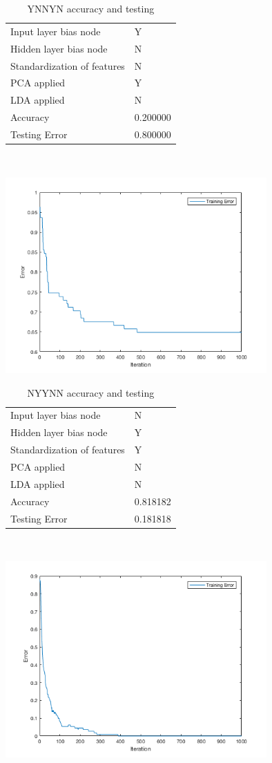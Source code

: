 \documentclass[12pt]{article}
\newcommand{\accuracyAndTestErrorTable}[8]{
  \begin{tabular}{l|l}
    \hline
    Input layer bias node & #1 \\
    Hidden layer bias node & #2 \\
    Standardization of features & #3 \\
    PCA applied & #4 \\
    LDA applied & #5 \\
    \hline
    Accuracy & #6 \\
    Testing Error & #7 \\
    \hline
  \end{tabular}
  ~\\[60pt]
  \caption{#8}
}
\begin{document}
\begin{center}
  \begin{table}[H]
    \begin{varwidth}[b]{0.4\linewidth}
      \centering
      \accuracyAndTestErrorTable{Y}{N}{N}{Y}{N}{0.200000}{0.800000}{YNNYN accuracy and testing}
      \label{table:YNNYN}
    \end{varwidth}%
    \hfill
    \begin{minipage}[b]{0.6\linewidth}
      \centering
      \includegraphics[width=100mm]{YNNYN_training_error.png}
      \label{fig:YNNYN}
    \end{minipage}
  \end{table}
\end{center}




\begin{center}
  \begin{table}[H]
    \begin{varwidth}[b]{0.4\linewidth}
      \centering
      \accuracyAndTestErrorTable{N}{Y}{Y}{N}{N}{0.818182}{0.181818}{NYYNN accuracy and testing}
      \label{table:NYYNN}
    \end{varwidth}%
    \hfill
    \begin{minipage}[b]{0.6\linewidth}
      \centering
      \includegraphics[width=100mm]{NYYNN_training_error.png}
      \label{fig:NYYNN}
    \end{minipage}
  \end{table}
\end{center}
\end{document}
